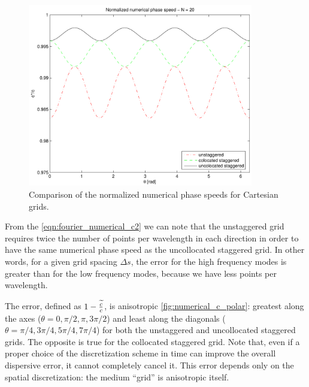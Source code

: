 \begin{figure}[htbp]
  \begin{center}
    \includegraphics[height=8cm]{pics/liu_fourier_fig3}
  \end{center}
  \caption{Comparison of the normalized numerical phase speeds for
    Cartesian grids.}
  \label{fig:numerical_c}
\end{figure}  

From the \eqref{eqn:fourier_numerical_c2} we can note that the unstaggered
grid requires twice the number of points per wavelength in each
direction in order to have the same numerical phase speed as the
uncollocated staggered grid. In other words, for a given grid spacing
$\Delta s$, the error for the high frequency modes is greater than for
the low frequency modes, because we have less points per wavelength.

The error, defined as $1 - \frac{\widetilde{c}}{c}$, is anisotropic
\eqref{fig:numerical_c_polar}: greatest along the axes ($\theta = 0,
\pi/2, \pi, 3\pi/2$) and least along the diagonals ($\theta = \pi/4,
3\pi/4, 5\pi/4, 7\pi/4$) for both the unstaggered and uncollocated
staggered grids. The opposite is true for the collocated staggered
grid. Note that, even if a proper choice of the discretization scheme
in time can improve the overall dispersive error, it cannot completely
cancel it. This error depends only on the spatial discretization: the
medium ``grid'' is anisotropic itself.

